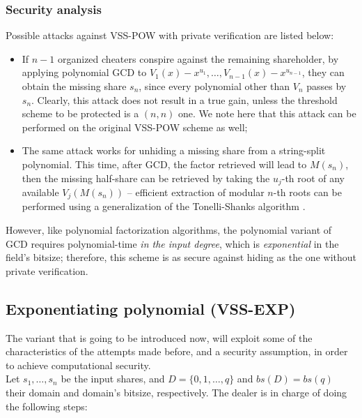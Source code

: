 \documentclass[10pt,journal,cspaper,compsoc]{IEEEtran}
\begin{document}
\subsubsection{Security analysis}
Possible attacks against VSS-POW with private verification are listed below:

\begin{itemize}
\item If $n-1$ organized cheaters conspire against the remaining shareholder, by applying polynomial GCD to ${V_1(x)-x^{u_1},}\ldots,V_{n-1}(x)-x^{u_{n-1}}$, they can obtain the missing share $s_n$, since every polynomial other than $V_n$ passes by $s_n$. Clearly, this attack does not result in a true gain, unless the threshold scheme to be protected is a $(n,n)$ one. We note here that this attack can be performed on the original VSS-POW scheme as well;
\item The same attack works for unhiding a missing share from a string-split polynomial. This time, after GCD, the factor retrieved will lead to $M(s_n)$, then the missing half-share can be retrieved by taking the $u_j$-th root of any available $V_j(M(s_n))$ -- efficient extraction of modular $n$-th roots can be performed using a generalization of the Tonelli-Shanks algorithm \cite{conf/focs/AdlemanMM77}.
\end{itemize}

However, like polynomial factorization algorithms, the polynomial variant of GCD requires polynomial-time \emph{in the input degree}, which is \emph{exponential} in the field's bitsize; therefore, this scheme is as secure against hiding as the one without private verification.

\subsection{Exponentiating polynomial (VSS-EXP)}
The variant that is going to be introduced now, will exploit some of the characteristics of the attempts made before, and a security assumption, in order to achieve computational security.\\

Let $s_1,\ldots,s_n$ be the input shares, and ${D=\{0,1,\ldots,q\}}$ and ${bs(D)=bs(q)}$ their domain and domain's bitsize, respectively. The dealer is in charge of doing the following steps:
\end{document}
